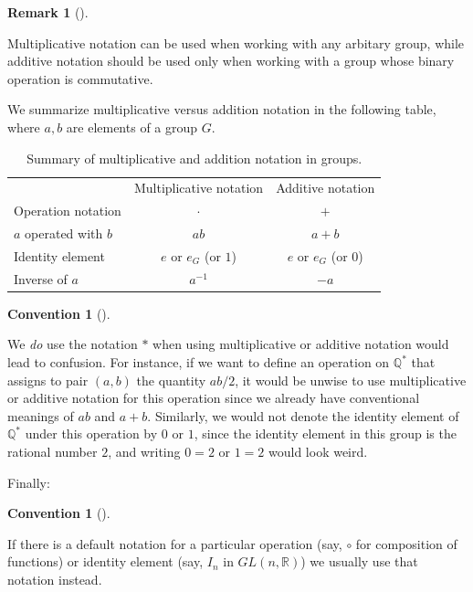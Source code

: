 \documentclass[10pt,]{book}
\theoremstyle{plain}
\theoremstyle{definition}
\theoremstyle{definition}
\newtheorem{remark}[theorem]{Remark}
\newtheorem{convention}[theorem]{Convention}
\theoremstyle{definition}
\theoremstyle{definition}
\numberwithin{equation}{section}
\newcommand{\hrulemedium}{\noalign{\hrule height 0.07em}}
\def\R{\mathbb{R}}
\def\Q{\mathbb{Q}}
\begin{document}
\par

            \begin{remark}[]\label{remark-9}

              Multiplicative notation can be used when working with any arbitary group, while additive notation should be used only when working with a group whose binary operation is commutative.
\end{remark}
%
\par
  We summarize multiplicative versus addition notation in the following table, where \(a,b\) are elements of a group \(G\). %
\par

\leavevmode%
\begin{table}
\centering
\begin{tabular}{lll}
\multicolumn{1}{c}{}&\multicolumn{1}{c}{Multiplicative notation}&\multicolumn{1}{c}{Additive notation}\tabularnewline\hrulemedium
Operation notation&\multicolumn{1}{c}{\(\cdot\)}&\multicolumn{1}{c}{\(+\)}\tabularnewline[0pt]
\(a\) operated with \(b\)&\multicolumn{1}{c}{\(ab\)}&\multicolumn{1}{c}{\(a+b\)}\tabularnewline[0pt]
Identity element&\multicolumn{1}{c}{\(e\) or \(e_G\) (or \(1\))}&\multicolumn{1}{c}{\(e\) or \(e_G\) (or \(0\))}\tabularnewline[0pt]
Inverse of \(a\)&\multicolumn{1}{c}{\(a^{-1}\)}&\multicolumn{1}{c}{\(-a\)}
\end{tabular}
\caption{Summary of multiplicative and addition notation in groups.\label{table-2}}
\end{table}
%
\begin{convention}[]\label{convention-2}

            We \emph{do} use the notation
            \(*\) when using multiplicative or additive notation would lead to
            confusion. For instance, if we want to define an operation on
            \(\Q^*\) that assigns to pair \((a,b)\) the quantity \(ab/2\), it would
            be unwise to use multiplicative or additive notation for this
            operation since we already have conventional meanings of \(ab\) and
            \(a+b\). Similarly, we would not denote the identity element of
            \(\Q^*\) under this operation by \(0\) or \(1\), since the identity
            element in this group is the rational number \(2\), and writing \(0=2\)
            or \(1=2\) would look weird.
\end{convention}
\par
Finally:%
\begin{convention}[]\label{convention-3}

            If there is a default notation for a particular
            operation (say, \(\circ\) for composition of functions) or identity
            element (say, \(I_n\) in \(GL(n,\R)\)) we usually use that notation
            instead.
\end{convention}
\typeout{************************************************}
\typeout{************************************************}
\end{document}

